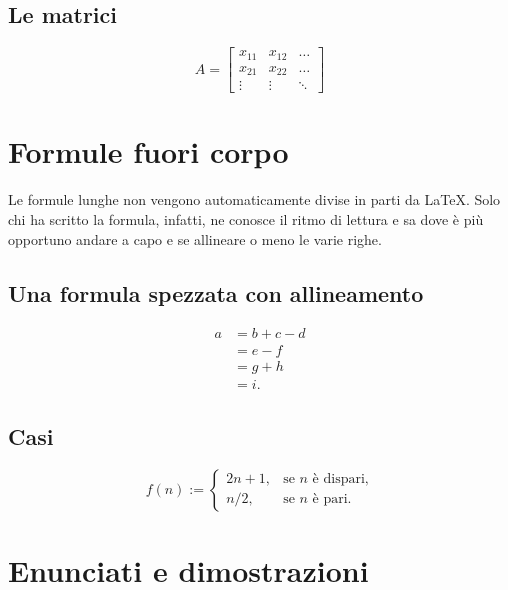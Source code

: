 \subsection{Le matrici}

\lipsum[2]
\begin{equation}
A=
\begin{bmatrix}
x_{11} & x_{12} & \dots \\
x_{21} & x_{22} & \dots \\
\vdots & \vdots & \ddots
\end{bmatrix}
\end{equation}



\section{Formule fuori corpo}

Le formule lunghe non vengono automaticamente divise in parti da \LaTeX. Solo chi ha scritto la formula, infatti, ne conosce il ritmo di lettura e sa dove è più opportuno andare a capo e se allineare o meno le varie righe.


\subsection{Una formula spezzata con allineamento}

\lipsum[2]
\begin{equation} 
\begin{split} 
a &= b+c-d \\ 
  &= e-f \\ 
  &= g+h \\ 
  &= i. 
\end{split} 
\end{equation}

 
\subsection{Casi}

\lipsum[2]
\begin{equation}
f(n):=
\begin{cases} 
2n+1, & \text{se $n$ è dispari,} \\ 
n/2,  & \text{se $n$ è pari.} 
\end{cases} 
\end{equation}



\section{Enunciati e dimostrazioni}

